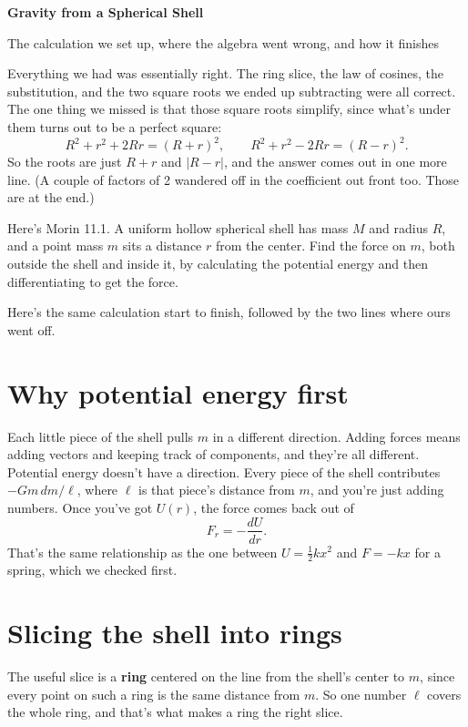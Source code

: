 \documentclass[11pt]{article}
\newcommand{\psettitle}[1]{
    \begin{center}
    \huge \textbf{#1}
    \end{center}
}
\begin{document}
\psettitle{Gravity from a Spherical Shell}
\begin{center}
\large The calculation we set up, where the algebra went wrong, and how it finishes
\end{center}

\bigskip

Everything we had was essentially right. The ring slice, the law of cosines, the
substitution, and the two square roots we ended up subtracting were all correct. The one
thing we missed is that those square roots simplify, since what's under them turns out to
be a perfect square:
\[
R^2 + r^2 + 2Rr = (R+r)^2,
\qquad
R^2 + r^2 - 2Rr = (R-r)^2 .
\]
So the roots are just $R+r$ and $|R-r|$, and the answer comes out in one more line. (A
couple of factors of 2 wandered off in the coefficient out front too. Those are at the
end.)

\bigskip

Here's Morin 11.1. A uniform hollow spherical shell has mass $M$ and radius $R$, and a
point mass $m$ sits a distance $r$ from the center. Find the force on $m$, both outside
the shell and inside it, by calculating the potential energy and then differentiating to
get the force.

Here's the same calculation start to finish, followed by the two lines where ours went
off.

\section*{Why potential energy first}

Each little piece of the shell pulls $m$ in a different direction. Adding forces means
adding vectors and keeping track of components, and they're all different. Potential
energy doesn't have a direction. Every piece of the shell contributes $-Gm\,dm/\ell$,
where $\ell$ is that piece's distance from $m$, and you're just adding numbers. Once
you've got $U(r)$, the force comes back out of
\[
F_r = -\frac{dU}{dr}.
\]
That's the same relationship as the one between $U = \tfrac12 k x^2$ and $F = -kx$ for a
spring, which we checked first.

\section*{Slicing the shell into rings}

The useful slice is a \textbf{ring} centered on the line from the shell's center to $m$,
since every point on such a ring is the same distance from $m$. So one number $\ell$
covers the whole ring, and that's what makes a ring the right slice.
\end{document}
